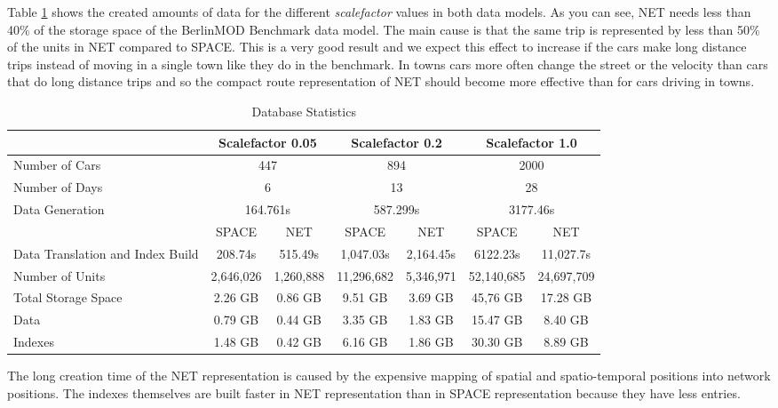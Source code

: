 \documentclass[a4paper]{article}
\newcommand{\bmodb} {BerlinMOD Benchmark}
\begin{document}
Table \ref{tab:dbstat} shows the created amounts of data for the different
\textit{scalefactor} values in both data models. As you can see, NET needs less
than 40\% of the storage space of the \bmodb{} data model. The main cause is
that the same trip is represented by less than 50\% of the units in NET
compared to SPACE. This is a very good result and we expect this effect to
increase if the cars make long distance trips instead of moving in a single town
like they do in the benchmark. In towns cars more often change the street or the
velocity than cars that do long distance trips and so the compact route
representation of NET should become more effective than for cars driving in towns.
\begin{table}[htbp]
\begin{center}
\begin{scriptsize}
\begin{tabularx}{1.0\textwidth}{|X|c|c|c|c|c|c|}
\hline
& \multicolumn{2}{c|}{\textbf{Scalefactor 0.05}} & \multicolumn{2}{c|}{\textbf{Scalefactor 0.2}} & \multicolumn{2}{c|}{\textbf{Scalefactor 1.0}}\\
\hline
Number of Cars                   & \multicolumn{2}{c|}{447}      & \multicolumn{2}{c|}{894}      & \multicolumn{2}{c|}{2000}
\\
\hline
Number of Days                   & \multicolumn{2}{c|}{6}        & \multicolumn{2}{c|}{13}       & \multicolumn{2}{c|}{28}\\
\hline
Data Generation                  & \multicolumn{2}{c|}{164.761s} & \multicolumn{2}{c|}{587.299s} & \multicolumn{2}{c|}{3177.46s}\\
\hline
                                 & SPACE     & NET               & SPACE      & NET              & SPACE      & NET\\
\hline
Data Translation and Index Build & 208.74s   & 515.49s           & 1,047.03s  & 2,164.45s        & 6122.23s   & 11,027.7s\\
\hline
Number of Units                  & 2,646,026 & 1,260,888         & 11,296,682 & 5,346,971        & 52,140,685 & 24,697,709\\
\hline
Total Storage Space              & 2.26 GB   & 0.86 GB           & 9.51 GB    & 3.69 GB          & 45,76 GB   & 17.28 GB\\
Data                             & 0.79 GB   & 0.44 GB           & 3.35 GB    & 1.83 GB          & 15.47 GB   &  8.40 GB\\
Indexes                          & 1.48 GB   & 0.42 GB           & 6.16 GB    & 1.86 GB          &30.30 GB    &  8.89 GB\\
\hline
\end{tabularx}
\end{scriptsize}
\caption{Database Statistics}
\label{tab:dbstat}
\end{center}
\end{table}
The long creation time of the NET representation is
caused by the expensive mapping of spatial and spatio-temporal positions into
network positions. The indexes themselves are built faster in NET representation
than in SPACE representation because they have less entries.
\end{document}
